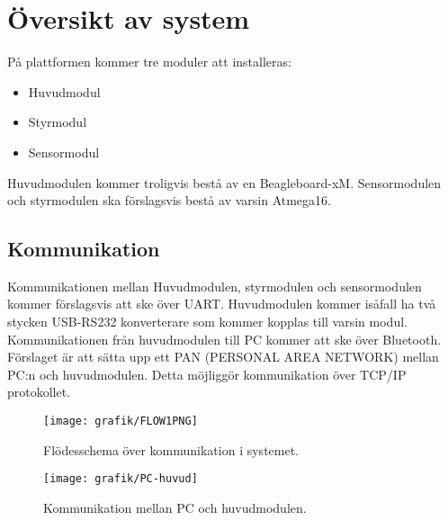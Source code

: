 \section{Översikt av system}
På plattformen kommer tre moduler att installeras:

\begin{itemize}
\item Huvudmodul
\item Styrmodul
\item Sensormodul
\end{itemize}
Huvudmodulen kommer troligvis bestå av en Beagleboard-xM. Sensormodulen och styrmodulen ska förslagsvis bestå av varsin Atmega16.
\subsection{Kommunikation}
Kommunikationen mellan Huvudmodulen, styrmodulen och sensormodulen kommer förslagsvis att ske över UART. Huvudmodulen kommer isåfall ha två stycken USB-RS232 konverterare som kommer kopplas till varsin modul. Kommunikationen från huvudmodulen till PC kommer att ske över Bluetooth. Förslaget är att sätta upp ett PAN (PERSONAL AREA NETWORK) mellan PC:n och huvudmodulen. Detta möjliggör kommunikation över TCP/IP protokollet.

\begin{figure}[h]
\center
\texttt{[image: grafik/FLOW1PNG]}
\caption{Flödesschema över kommunikation i systemet.}
\end{figure}

\begin{figure}[h]
\center
\texttt{[image: grafik/PC-huvud]}
\caption{Kommunikation mellan PC och huvudmodulen.}
\end{figure}

